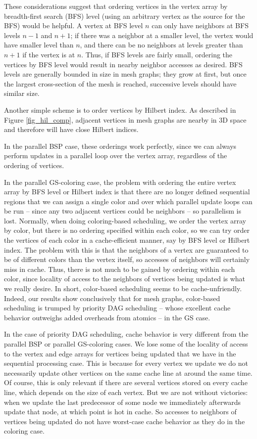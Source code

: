 \documentclass[journal]{IEEEtran}
\begin{document}
These considerations suggest that ordering vertices in the vertex array by breadth-first search (BFS) level (using an arbitrary vertex as the source for the BFS) would be helpful. A vertex at BFS level $n$ can only have neighbors at BFS levels $n-1$ and $n+1$; if there was a neighbor at a smaller level, the vertex would have smaller level than $n$, and there can be no neighbors at levels greater than $n+1$ if the vertex is at $n$. Thus, if BFS levels are fairly small, ordering the vertices by BFS level would result in nearby neighbor accesses as desired. BFS levels are generally bounded in size in mesh graphs; they grow at first, but once the largest cross-section of the mesh is reached, successive levels should have similar size.

Another simple scheme is to order vertices by Hilbert index. As described in Figure \ref{fig_hil_comp}, adjacent vertices in mesh graphs are nearby in 3D space and therefore will have close Hilbert indices.

In the parallel BSP case, these orderings work perfectly, since we can always perform updates in a parallel loop over the vertex array, regardless of the ordering of vertices. 

In the parallel GS-coloring case, the problem with ordering the entire vertex array by BFS level or Hilbert index is that there are no longer defined sequential regions that we can assign a single color and over which parallel update loops can be run -- since any two adjacent vertices could be neighbors -- so parallelism is lost. Normally, when doing coloring-based scheduling, we order the vertex array by color, but there is no ordering specified within each color, so we can try order the vertices of each color in a cache-efficient manner, say by BFS level or Hilbert index. The problem with this is that the neighbors of a vertex are guaranteed to be of different colors than the vertex itself, so accesses of neighbors will certainly miss in cache. Thus, there is not much to be gained by ordering within each color, since locality of access to the neighbors of vertices being updated is what we really desire. In short, color-based scheduling seems to be cache-unfriendly. Indeed, our results show conclusively that for mesh graphs, color-based scheduling is trumped by priority DAG scheduling -- whose excellent cache behavior outweighs added overheads from atomics -- in the GS case.

In the case of priority DAG scheduling, cache behavior is very different from the parallel BSP or parallel GS-coloring cases. We lose some of the locality of access to the vertex and edge arrays for vertices being updated that we have in the sequential processing case. This is because for every vertex we update we do not necessarily update other vertices on the same cache line at around the same time. Of course, this is only relevant if there are several vertices stored on every cache line, which depends on the size of each vertex. But we are not without victories: when we update the last predecessor of some node we immediately afterwards update that node, at which point is hot in cache. So accesses to neighbors of vertices being updated do not have worst-case cache behavior as they do in the coloring case.
\end{document}

